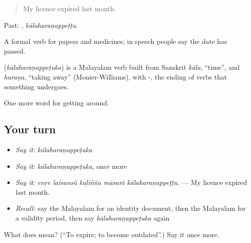 \begin{quote}
My licence expired last month.
\end{quote}

Past: , \emph{kālaharaṇappeṭṭu}.

A formal verb for papers and medicines; in speech people say the date has passed.

\begin{cousinweb}
\textbf{} (\emph{kālaharaṇappeṭuka}) is a Malayalam verb built from Sanskrit \emph{kāla}, \textquotedblleft{}time\textquotedblright{}, and \emph{haraṇa}, \textquotedblleft{}taking away\textquotedblright{} (Monier-Williams), with -, the ending of verbs that something undergoes.
\end{cousinweb}

\begin{grammarlens}[title={What you've built}]
One more word for getting around.
\end{grammarlens}

\subsection*{Your turn}
\begin{itemize}
\raggedright
  \item \emph{Say it:} \emph{kālaharaṇappeṭuka}
  \item \emph{Say it:} \emph{kālaharaṇappeṭuka}, once more
  \item \emph{Say it:} \emph{enṟe laisansŭ kaḻiñña māsaṁ kālaharaṇappeṭṭu.} — My licence expired last month.
  \item \emph{Recall:} say the Malayalam for an identity document, then the Malayalam for a validity period, then say \emph{kālaharaṇappeṭuka} again
\end{itemize}

\begin{tcolorbox}[breakable,colback=teal!4,colframe=teal!35!black,title={Before you move on}]
What does  mean? (\textquotedblleft{}To expire; to become outdated\textquotedblright{}.) Say it once more.
\end{tcolorbox}
